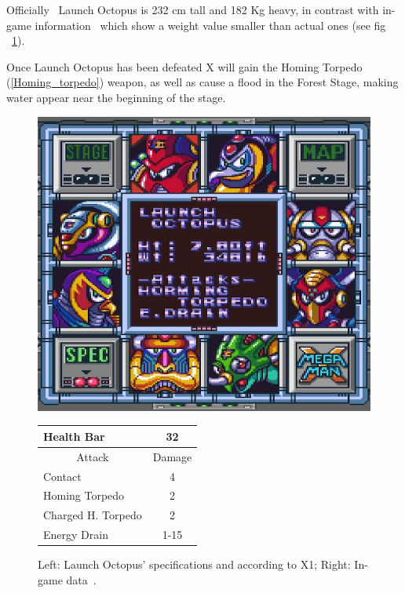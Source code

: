 Officially~\cite{wayback:X_resources} Launch Octopus is 232 cm tall and 182 Kg heavy, in contrast with in-game information~\cite{wiki:Launch_octopus} which show a weight value smaller than actual ones (see fig ~\ref{Octopus_specs}).

Once Launch Octopus has been defeated X will gain the Homing Torpedo (\ref{Homing_torpedo}) weapon, as well as cause a flood in the Forest Stage, making water appear near the beginning of the stage.


\begin{figure}[htp]
	\begin{minipage}[c]{0.45\linewidth}
		\vspace{0pt}
		\centering
		\includegraphics[width=\linewidth]{figures/X1/Launch_octopus/Launch_octopus_specs.png}
	\end{minipage}
	\begin{minipage}[c]{0.45\linewidth}
		\centering
		\vspace{0pt}
		\begin{tabular}[h]{l c}
			\toprule
			Health Bar & 32\\
			\midrule
			\multicolumn{1}{c}{Attack} & \multicolumn{1}{c}{Damage}\\
			Contact & 4\\
			Homing Torpedo & 2\\
			Charged H. Torpedo & 2\\
			Energy Drain & 1-15\\
			\bottomrule
		\end{tabular}
	\end{minipage}
	\caption{Left: Launch Octopus' specifications and according to X1; Right: In-game data~\cite{wiki:Launch_octopus}. }
	\label{Octopus_specs}
\end{figure}


